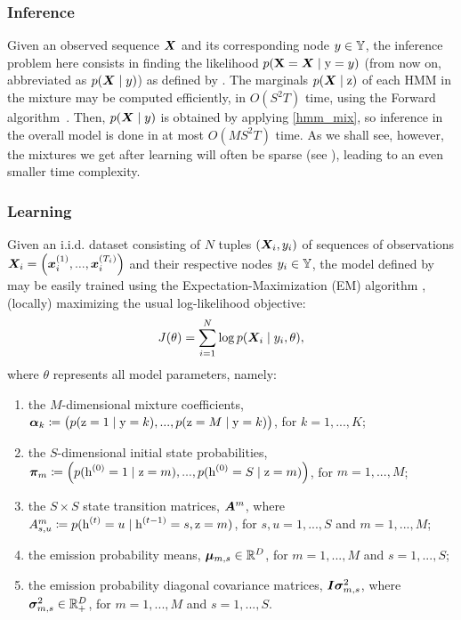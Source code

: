 \subsubsection{Inference}
\label{sec:inference}
Given an observed sequence ${\bm{X}}$ and its corresponding node $y \in {\mathbb{Y}}$, the inference problem here consists in finding the likelihood $p({\mathbf{X}}={\bm{X}} \mid {\textnormal{y}}=y)$ (from now on, abbreviated as $p({\bm{X}} \mid y)$) as defined by  . The marginals $p({\bm{X}}\mid{\textnormal{z}})$ of each HMM in the mixture may be computed efficiently, in $O(S^2T)$ time, using the Forward algorithm~\cite{Rabiner1986}. Then, $p({\bm{X}} \mid y)$ is obtained by applying \eqref{hmm_mix}, so inference in the overall model is done in at most $O(MS^2T)$ time. As we shall see, however, the mixtures we get after learning will often be sparse (see ), leading to an even smaller time complexity.

\subsubsection{Learning}
\label{sec:learning}
Given an i.i.d. dataset consisting of $N$ tuples $({\bm{X}}_i, y_i)$ of sequences of observations ${\bm{X}}_i = \left({\bm{x}}_i^{(1)}, ...,{\bm{x}}_i^{(T_i)} \right)$ and their respective nodes $y_i \in {\mathbb{Y}}$, the model defined by  may be easily trained using the Expectation-Maximization (EM) algorithm \cite{Dempster1977}, (locally) maximizing the usual log-likelihood objective:
\begin{equation}
\label{log_likelihood}
J(\theta) = \sum_{i=1}^N \log p({\bm{X}}_i \mid y_i, \theta),
\end{equation}
where $\theta$ represents all model parameters, namely:
\begin{enumerate}
	\item the $M$-dimensional mixture coefficients, ${\bm{\alpha}}_k \coloneqq \left(p({\textnormal{z}}=1\mid{\textnormal{y}}=k), ..., p({\textnormal{z}}=M\mid{\textnormal{y}}=k)\right)$, for $k = 1,...,K$;
	\item the $S$-dimensional initial state probabilities, ${\bm{\pi}}_m \coloneqq \left(p({\textnormal{h}}^{(0)}=1 \mid {\textnormal{z}}=m),...,p({\textnormal{h}}^{(0)}=S \mid {\textnormal{z}}=m)\right)$, for $m = 1,...,M$;
	\item the $S \times S$ state transition matrices, ${\bm{A}}^m$, where ${A}^m_{s,u} \coloneqq p({\textnormal{h}}^{(t)}=u \mid {\textnormal{h}}^{(t-1)}=s, {\textnormal{z}}=m)$, for $s,u = 1,...,S$ and $m = 1,...,M$;
	\item the emission probability means, ${\bm{\mu}}_{m,s} \in \mathbb{R}^D$, for $m = 1,...,M$ and $s = 1,...,S$;
	\item the emission probability diagonal covariance matrices, ${\bm{I}} {\bm{\sigma}}^2_{m,s}$, where ${\bm{\sigma}}^2_{m,s} \in \mathbb{R}^{D}_{+}$, for $m = 1,...,M$ and $s = 1,...,S$.
\end{enumerate}

